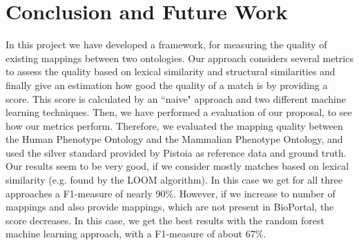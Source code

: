 \documentclass[runningheads]{llncs}
\begin{document}
\section{Conclusion and Future Work} \label{conclusion}
In this project we have developed a framework, for measuring the quality of existing mappings between two ontologies. Our approach considers several metrics to assess the quality based on lexical similarity and structural similarities and finally give an estimation how good the quality of a match is by providing a score. This score is calculated by an ``naive" approach and two different machine learning techniques. Then, we have performed a evaluation of our proposal, to see how our metrics perform. Therefore, we evaluated the mapping quality between the Human Phenotype Ontology and the Mammalian Phenotype Ontology, and used the silver standard provided by Pistoia as reference data and ground truth. 
Our results seem to be very good, if we consider mostly matches based on lexical similarity (e.g. found by the LOOM algorithm). In this case we get for all three approaches a F1-measure of nearly 90\%. However, if we increase to number of mappings and also provide mappings, which are not present in BioPortal, the score decreases. In this case, we get the best results with the random forest machine learning approach, with a F1-measure of about 67\%. \\
\end{document}
